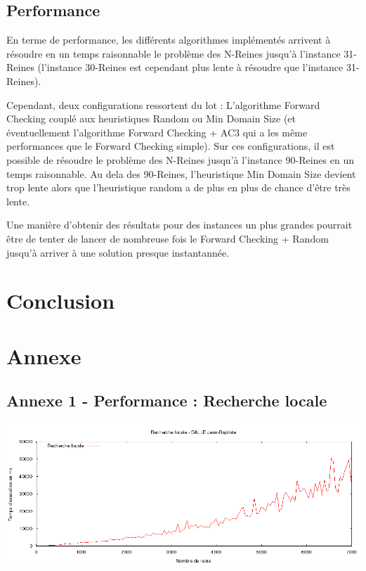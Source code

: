 \documentclass[a4paper,10pt]{article}
\begin{document}
\subsection{Performance}

En terme de performance, les différents algorithmes implémentés arrivent à résoudre en un temps raisonnable le problème des N-Reines jusqu'à l'instance 31-Reines (l'instance 30-Reines est cependant plus lente à résoudre que l'instance 31-Reines).

Cependant, deux configurations ressortent du lot : L'algorithme Forward Checking couplé aux heuristiques Random ou Min Domain Size (et éventuellement l'algorithme Forward Checking + AC3 qui a les même performances que le Forward Checking simple). Sur ces configurations, il est possible de résoudre le problème des N-Reines jusqu'à l'instance 90-Reines en un temps raisonnable. Au dela des 90-Reines, l'heuristique Min Domain Size devient trop lente alors que l'heuristique random a de plus en plus de chance d'être très lente.

Une manière d'obtenir des résultats pour des instances un plus grandes pourrait être de tenter de lancer de nombreuse fois le Forward Checking + Random jusqu'à arriver à une solution presque instantannée.

\section{Conclusion}

\section{Annexe}

\subsection{Annexe 1 - Performance : Recherche locale}
\includegraphics[width=1\textwidth]{Recherche_Locale.png}
\end{document}
